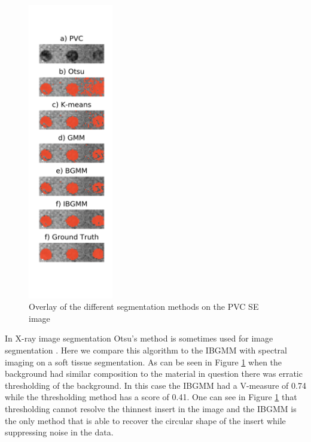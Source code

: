 \documentclass[a4paper,11pt]{article}
\begin{document}
\begin{figure}
  
  \begin{center}
    \includegraphics[width=0.33\textwidth]{figures/otsu.png}
  \end{center}
  
  \caption{Overlay of the different segmentation methods on the PVC SE image}
  
  \label{results:otsu}
\end{figure}

In X-ray image segmentation Otsu's method \cite{Otsu1979AHistograms} is sometimes used for image segmentation \cite{Sund2003AnImaging}. Here we compare this algorithm to the IBGMM with spectral imaging on a soft tissue segmentation. As can be seen in Figure \ref{results:otsu} when the background had similar composition to the material in question there was erratic thresholding of the background. In this case the IBGMM had a V-measure of 0.74 while the thresholding method has a score of 0.41. One can see in Figure \ref{results:otsu} that thresholding cannot resolve the thinnest insert in the image and the IBGMM is the only method that is able to recover the circular shape of the insert while suppressing noise in the data.
\end{document}
